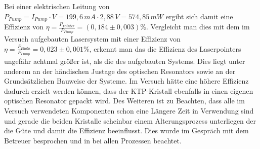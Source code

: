 \documentclass[twoside,colorback,accentcolor=tud4c,11pt]{tudreport}
\begin{document}
Bei einer elektrischen Leitung von $P_{Pump}=I_{Pump}\cdot V=199,6\,\si{mA}\cdot 2,88\,\si{V}=574,85\,\si{mW}$ ergibt sich damit eine Effizienz von $\eta=\frac{P_{Pointer}}{P_{Pump}}=(0,184\pm 0,003) \%$. Vergleicht man dies mit dem im Versuch aufgebauten Lasersystem mit einer Effizienz von $\eta=\frac{P_{Photo}}{P_{Pump}}=0,023\pm0,001 \%$, erkennt man das die Effizienz des Laserpointers ungefähr achtmal größer ist, als die des aufgebauten Systems. Dies liegt unter anderem an der händischen Justage des optischen Resonators sowie an der Grundsätzlichen Bauweise der Systeme. Im Versuch hätte eine höhere Effizienz dadurch erzielt werden können, dass der KTP-Kristall ebenfalls in einen eigenen optischen Resonator gepackt wird. Des Weiteren ist zu Beachten, dass alle im Versuch verwendeten Komponenten schon eine Längere Zeit in Verwendung sind und gerade die beiden Kristalle scheinbar einem Alterungsprozess unterliegen der die Güte und damit die Effizienz beeinflusst. Dies wurde im Gespräch mit dem Betreuer besprochen und in bei allen Prozessen beachtet.
\end{document}
